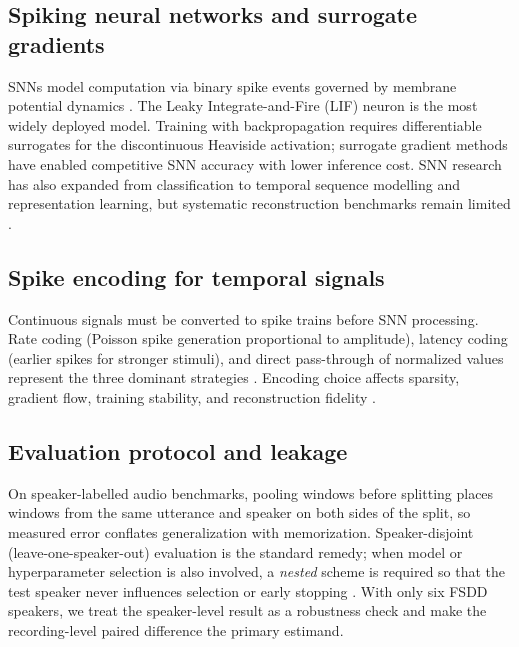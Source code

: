 \documentclass[conference]{IEEEtran}
\begin{document}
\subsection{Spiking neural networks and surrogate gradients}
\par SNNs model computation via binary spike events governed by membrane
potential dynamics \cite{gerstner2002spiking,maass1997networks}.
The Leaky Integrate-and-Fire (LIF) neuron is the most widely deployed model.
Training with backpropagation requires differentiable surrogates for the
discontinuous Heaviside activation; surrogate gradient methods
\cite{neftci2019surrogate,zenke2021remarkable,bellec2020solution} have
enabled competitive SNN accuracy with lower inference cost.
SNN research has also expanded from classification to temporal sequence
modelling and representation learning, but systematic reconstruction
benchmarks remain limited \cite{bellec2020solution,eshraghian2023training}.

\subsection{Spike encoding for temporal signals}
\par Continuous signals must be converted to spike trains before SNN processing.
Rate coding (Poisson spike generation proportional to amplitude), latency
coding (earlier spikes for stronger stimuli), and direct pass-through of
normalized values represent the three dominant strategies
\cite{neftci2019surrogate,thorpe1998rank}.
Encoding choice affects sparsity, gradient flow, training stability, and
reconstruction fidelity \cite{neftci2019surrogate}.

\subsection{Evaluation protocol and leakage}
\par On speaker-labelled audio benchmarks, pooling windows before splitting
places windows from the same utterance and speaker on both sides of the split,
so measured error conflates generalization with memorization. Speaker-disjoint
(leave-one-speaker-out) evaluation is the standard remedy; when model or
hyperparameter selection is also involved, a \emph{nested} scheme is required so
that the test speaker never influences selection or early stopping
\cite{cawley2010overfitting}. With only six FSDD speakers, we treat the
speaker-level result as a robustness check and make the recording-level paired
difference the primary estimand.
\end{document}
